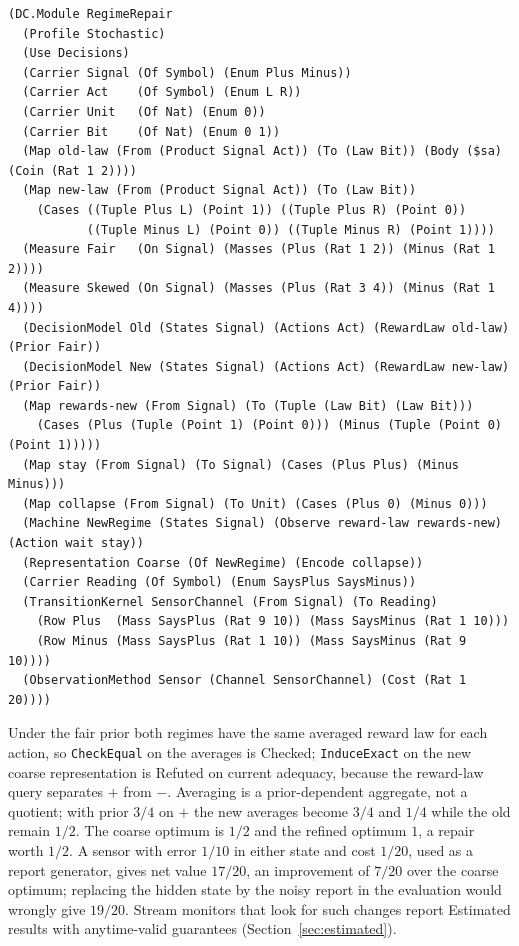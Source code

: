 \documentclass[11pt]{article}
\newcommand{\code}[1]{\texttt{#1}}
\theoremstyle{definition}
\theoremstyle{plain}
\begin{document}
\begin{lstlisting}[basicstyle=\ttfamily\footnotesize,title={\scriptsize\ttfamily fixtures/regime\_repair.metta}]
(DC.Module RegimeRepair
  (Profile Stochastic)
  (Use Decisions)
  (Carrier Signal (Of Symbol) (Enum Plus Minus))
  (Carrier Act    (Of Symbol) (Enum L R))
  (Carrier Unit   (Of Nat) (Enum 0))
  (Carrier Bit    (Of Nat) (Enum 0 1))
  (Map old-law (From (Product Signal Act)) (To (Law Bit)) (Body ($sa) (Coin (Rat 1 2))))
  (Map new-law (From (Product Signal Act)) (To (Law Bit))
    (Cases ((Tuple Plus L) (Point 1)) ((Tuple Plus R) (Point 0))
           ((Tuple Minus L) (Point 0)) ((Tuple Minus R) (Point 1))))
  (Measure Fair   (On Signal) (Masses (Plus (Rat 1 2)) (Minus (Rat 1 2))))
  (Measure Skewed (On Signal) (Masses (Plus (Rat 3 4)) (Minus (Rat 1 4))))
  (DecisionModel Old (States Signal) (Actions Act) (RewardLaw old-law) (Prior Fair))
  (DecisionModel New (States Signal) (Actions Act) (RewardLaw new-law) (Prior Fair))
  (Map rewards-new (From Signal) (To (Tuple (Law Bit) (Law Bit)))
    (Cases (Plus (Tuple (Point 1) (Point 0))) (Minus (Tuple (Point 0) (Point 1)))))
  (Map stay (From Signal) (To Signal) (Cases (Plus Plus) (Minus Minus)))
  (Map collapse (From Signal) (To Unit) (Cases (Plus 0) (Minus 0)))
  (Machine NewRegime (States Signal) (Observe reward-law rewards-new) (Action wait stay))
  (Representation Coarse (Of NewRegime) (Encode collapse))
  (Carrier Reading (Of Symbol) (Enum SaysPlus SaysMinus))
  (TransitionKernel SensorChannel (From Signal) (To Reading)
    (Row Plus  (Mass SaysPlus (Rat 9 10)) (Mass SaysMinus (Rat 1 10)))
    (Row Minus (Mass SaysPlus (Rat 1 10)) (Mass SaysMinus (Rat 9 10))))
  (ObservationMethod Sensor (Channel SensorChannel) (Cost (Rat 1 20))))
\end{lstlisting}

Under the fair prior both regimes have the same averaged reward law for each action, so
\code{CheckEqual} on the averages is Checked; \code{InduceExact} on the new coarse representation
is Refuted on current adequacy, because the reward-law query separates $+$ from $-$. Averaging is a
prior-dependent aggregate, not a quotient; with prior $3/4$ on $+$ the new averages become $3/4$ and
$1/4$ while the old remain $1/2$. The coarse optimum is $1/2$ and the refined optimum $1$, a repair
worth $1/2$. A sensor with error $1/10$ in either state and cost $1/20$, used as a report generator,
gives net value $17/20$, an improvement of $7/20$ over the coarse optimum; replacing the hidden state
by the noisy report in the evaluation would wrongly give $19/20$. Stream monitors that look for such
changes report Estimated results with anytime-valid guarantees (Section~\ref{sec:estimated}).
\end{document}
